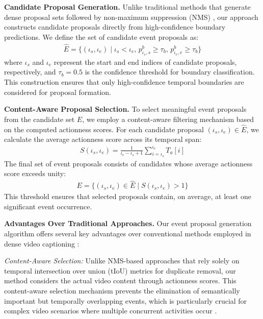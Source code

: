 \textbf{Candidate Proposal Generation.}
Unlike traditional methods that generate dense proposal sets followed by non-maximum suppression (NMS) \cite{hosang2017learning}, our approach constructs candidate proposals directly from high-confidence boundary predictions. We define the set of candidate event proposals as:
\begin{align}
  \hat{E} = \{(\iota_s, \iota_e) \mid \iota_s < \iota_e, \, p_{\iota_s,s}^b \geq \tau_b, \, p_{\iota_e,e}^b \geq \tau_b\}
\end{align}
where $\iota_s$ and $\iota_e$ represent the start and end indices of candidate proposals, respectively, and $\tau_b = 0.5$ is the confidence threshold for boundary classification. This construction ensures that only high-confidence temporal boundaries are considered for proposal formation.

\textbf{Content-Aware Proposal Selection.}
To select meaningful event proposals from the candidate set $\hat{E}$, we employ a content-aware filtering mechanism based on the computed actionness scores. For each candidate proposal $(\iota_s, \iota_e) \in \hat{E}$, we calculate the average actionness score across its temporal span:
\begin{align}
  S(\iota_s, \iota_e) = \frac{1}{\iota_e - \iota_s + 1} \sum_{i=\iota_s}^{\iota_e} T_a[i]
\end{align}
The final set of event proposals consists of candidates whose average actionness score exceeds unity:
\begin{align}
  E = \{(\iota_s, \iota_e) \in \hat{E} \mid S(\iota_s, \iota_e) > 1\}
\end{align}
This threshold ensures that selected proposals contain, on average, at least one significant event occurrence.

\textbf{Advantages Over Traditional Approaches.}
Our event proposal generation algorithm offers several key advantages over conventional methods employed in dense video captioning \cite{Krishna2017-pw, Li2018-ll, Wang2018-ap}:

\textit{Content-Aware Selection:} Unlike NMS-based approaches \cite{hosang2017learning} that rely solely on temporal intersection over union (tIoU) metrics for duplicate removal, our method considers the actual video content through actionness scores.
This content-aware selection mechanism prevents the elimination of semantically important but temporally overlapping events, which is particularly crucial for complex video scenarios where multiple concurrent activities occur \cite{Mun2019-ap}.

